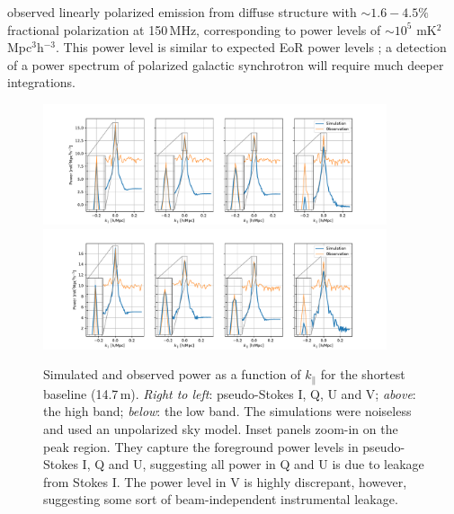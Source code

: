 \cite{Lenc.16} observed linearly polarized emission from diffuse structure with $\sim 1.6 - 4.5\%$ fractional polarization at 150\,MHz, corresponding to power levels of $\sim10^5$ mK$^2$Mpc$^3$h$^{-3}$. This power level is similar to expected EoR power levels \citep[e.g.][]{Lidz.07, Moore.13, Nunhokee.17}; a detection of a power spectrum of polarized galactic synchrotron will require much deeper integrations.

\begin{figure}
\centering
\includegraphics[width=0.9\textwidth]{chapters/eor_window_HERA/figures/highband_bl0_4pol_with_zoom.pdf}\\
\includegraphics[width=0.9\textwidth]{chapters/eor_window_HERA/figures/lowband_bl0_4pol_with_zoom.pdf}
\caption[Simulated and observed power as a function of $k_{\parallel}$ for the shortest baseline (14.7\,m).]{Simulated and observed power as a function of $k_{\parallel}$ for the shortest baseline (14.7\,m). \textit{Right to left}: pseudo-Stokes I, Q, U and V; \textit{above}: the high band; \textit{below}: the low band. The simulations were noiseless and used an unpolarized sky model. Inset panels zoom-in on the peak region. They capture the foreground power levels in pseudo-Stokes I, Q and U, suggesting all power in Q and U is due to leakage from Stokes I. The power level in V is highly discrepant, however, suggesting some sort of beam-independent instrumental leakage.}
\label{fig:hera19_bl0_cuts_vs_sim}
\end{figure}

